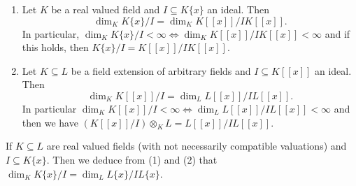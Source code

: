 \documentclass[10pt,a4paper]{amsart}
\begin{document}
 \begin{Lemma}\label{lem.lefschetz}\text{  }
\begin{enumerate} 
\item [(1)]  Let $K$ be a real valued field and  $I\subseteq K\{x\}$ an ideal. Then   
$$\dim_K K\{x\}/I =\dim_K K[[x]]/I K[[x]].$$ 
In particular,
$\dim_K K\{x\}/I< \infty \iff \dim_K K[[x]]/I K[[x]]< \infty $ and if this holds, then $K\{x\}/I = K[[x]]/I K[[x]]$.
\item [(2)]  Let $K\subseteq L$ be a field extension of arbitrary fields and $I\subseteq K[[x]]$ an ideal. Then 
$$\dim_K K[[x]]/I=\dim_{L} L[[x]]/IL[[x]].$$ 
In particular
 $\dim_K K[[x]]/I < \infty \iff \dim_L L[[x]]/I L[[x]]< \infty $ 
  and then we have  $(K[[x]]/I)\otimes_K L=L[[x]]/I L[[x]].$
\end{enumerate} 
If $K\subseteq L$ are real valued fields (with not necessarily compatible valuations) and $I\subseteq K\{x\}$. Then we deduce from (1) and (2) that 
$\dim_K K\{x\}/I=\dim_{L} L\{x\}/IL\{x\}.$ 
\end{Lemma}
\end{document}
